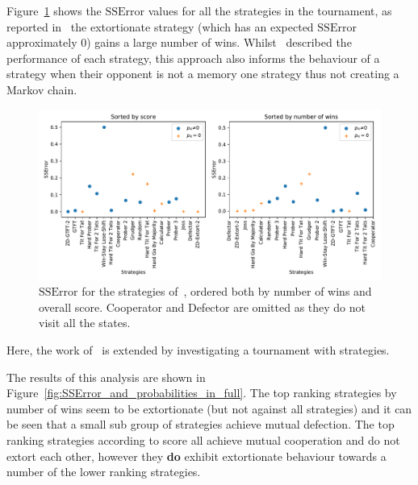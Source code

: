 \documentclass[a4paper]{article}
\begin{document}
Figure~\ref{fig:SSError_overall_in_stewart_plotkin} shows the \(\text{SSError}\)
values for all the strategies in the tournament, as reported
in~\cite{Stewart2012} the extortionate strategy (which has an expected
\(\text{SSError}\) approximately 0) gains a large number of wins.
Whilst~\cite{Stewart2012} described the performance of each strategy, this
approach also informs the behaviour of a strategy when their opponent is not a
memory one strategy thus not creating a Markov chain.

\begin{figure}[!htbp]
    \centering
    \includegraphics[width=.8\textwidth]{./assets/img/SSError_overall_in_stewart_plotkin/main.pdf}
    \caption{\(\text{SSError}\) for the strategies of~\cite{Stewart2012}, ordered both by
    number of wins and overall score. Cooperator and Defector are omitted as
    they do not visit all the states.}
    \label{fig:SSError_overall_in_stewart_plotkin}
\end{figure}

Here, the work of~\cite{Stewart2012} is extended by investigating a tournament
with 
strategies.

The results of this analysis are shown in
Figure~\ref{fig:SSError_and_probabilities_in_full}. The top ranking strategies
by number of wins seem to be extortionate (but not against all strategies) and
it can be seen that a small sub group of strategies achieve mutual defection.
The top ranking strategies according to score all achieve mutual cooperation and
do not extort each other, however they
\textbf{do} exhibit extortionate behaviour towards a number of the lower ranking
strategies.
\end{document}
